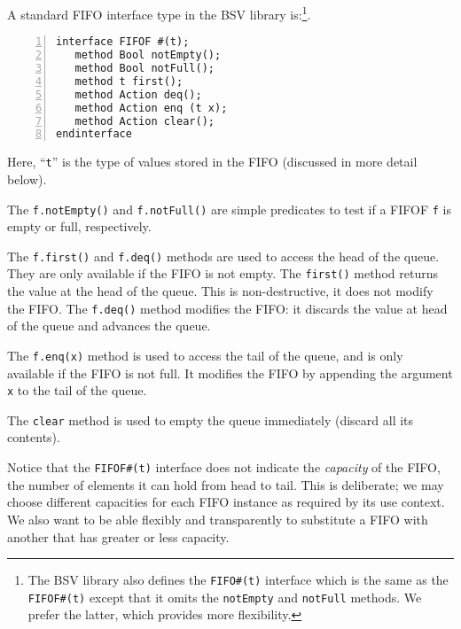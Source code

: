 \label{Sec_FIFOF_interface}


A standard FIFO interface type in the BSV library is:\footnote{The BSV
library also defines the {\tt FIFO\#(t)} interface which is the same
as the {\tt FIFOF\#(t)} except that it omits the {\tt notEmpty} and
{\tt notFull} methods.  We prefer the latter, which provides more
flexibility.}.

{\small
\begin{Verbatim}[frame=single, numbers=left]
interface FIFOF #(t);
   method Bool notEmpty();
   method Bool notFull();
   method t first();
   method Action deq();
   method Action enq (t x);
   method Action clear();
endinterface
\end{Verbatim}
}

Here, ``\verb|t|'' is the type of values stored in the FIFO (discussed
in more detail below).

The \verb|f.notEmpty()| and \verb|f.notFull()| are simple predicates
to test if a FIFOF {\tt f} is empty or full, respectively.

The \verb|f.first()| and \verb|f.deq()| methods are used to access the
head of the queue.  They are only available if the FIFO is not empty.
The \verb|first()| method returns the value at the head of the queue.
This is non-destructive, {\ie} it does not modify the FIFO.  The
\verb|f.deq()| method modifies the FIFO: it discards the value at head
of the queue and advances the queue.

The \verb|f.enq(x)| method is used to access the tail of the queue,
and is only available if the FIFO is not full.  It modifies the FIFO
by appending the argument \verb|x| to the tail of the queue.

The \verb|clear| method is used to empty the queue immediately
(discard all its contents).

Notice that the {\tt FIFOF\#(t)} interface does not indicate the
\emph{capacity} of the FIFO, {\ie} the number of elements it can hold
from head to tail.  This is deliberate; we may choose different
capacities for each FIFO instance as required by its use context.  We
also want to be able flexibly and transparently to substitute a FIFO
with another that has greater or less capacity.


